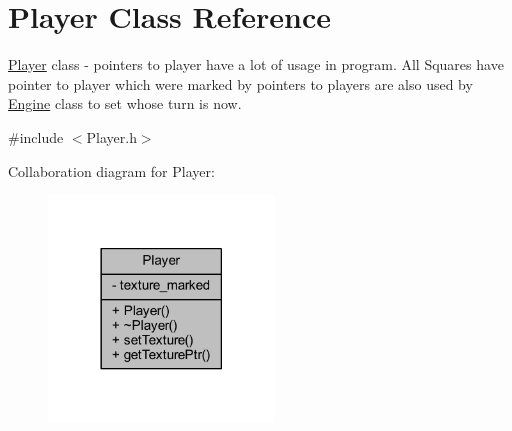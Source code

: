 \hypertarget{class_player}{}\section{Player Class Reference}
\label{class_player}


\hyperlink{class_player}{Player} class -\/ pointers to player have a lot of usage in program. All Squares have pointer to player which were marked by pointers to players are also used by \hyperlink{class_engine}{Engine} class to set whose turn is now.  




{\ttfamily \#include $<$Player.\+h$>$}



Collaboration diagram for Player\+:
\nopagebreak
\begin{figure}[H]
\begin{center}
\leavevmode
\includegraphics[width=170pt]{class_player__coll__graph}
\end{center}
\end{figure}
